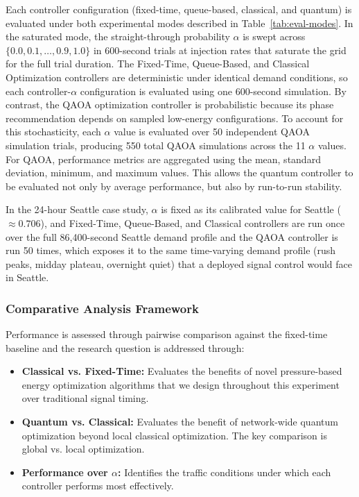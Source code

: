 \documentclass[12pt]{article}
\begin{document}
Each controller configuration (fixed-time, queue-based, classical, and quantum) is evaluated under both experimental modes described in Table~\ref{tab:eval-modes}. In the saturated mode, the straight-through probability $\alpha$ is swept across $\{0.0, 0.1, \ldots, 0.9, 1.0\}$ in 600-second trials at injection rates that saturate the grid for the full trial duration. The Fixed-Time, Queue-Based, and Classical Optimization controllers are deterministic under identical demand conditions, so each controller-$\alpha$ configuration is evaluated using one 600-second simulation. By contrast, the QAOA optimization controller is probabilistic because its phase recommendation depends on sampled low-energy configurations. To account for this stochasticity, each $\alpha$ value is evaluated over 50 independent QAOA simulation trials, producing 550 total QAOA simulations across the 11 $\alpha$ values. For QAOA, performance metrics are aggregated using the mean, standard deviation, minimum, and maximum values. This allows the quantum controller to be evaluated not only by average performance, but also by run-to-run stability.

In the 24-hour Seattle case study, $\alpha$ is fixed as its calibrated value for Seattle ($\approx 0.706$), and Fixed-Time, Queue-Based, and Classical controllers are run once over the full 86,400-second Seattle demand profile and the QAOA controller is run 50 times, which exposes it to the same time-varying demand profile (rush peaks, midday plateau, overnight quiet) that a deployed signal control would face in Seattle.

\subsubsection{Comparative Analysis Framework}

Performance is assessed through pairwise comparison against the fixed-time baseline and the research question is addressed through:



\begin{itemize}
    \item \textbf{Classical vs. Fixed-Time:} Evaluates the benefits of novel pressure-based energy optimization algorithms that we design throughout this experiment over traditional signal timing.

    \item \textbf{Quantum vs. Classical:} Evaluates the benefit of network-wide quantum optimization beyond local classical optimization. The key comparison is global vs. local optimization.

    \item \textbf{Performance over $\alpha$:} Identifies the traffic conditions under which each controller performs most effectively.

\end{itemize}
\end{document}
